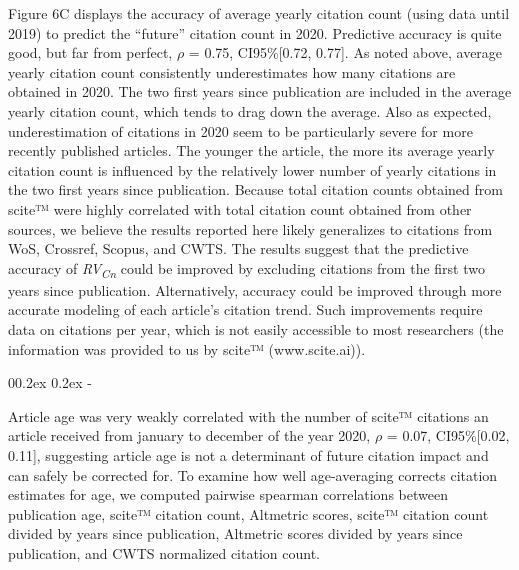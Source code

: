 \documentclass[
  man,floatsintext]{apa6}
\makeatletter
\let\oldsubparagraph\subparagraph
\renewcommand{\subparagraph}[1]{\oldsubparagraph{#1}\mbox{}}
\renewcommand{\subparagraph}[1]{\@startsection{subparagraph}{5}{1em}%
  {0\baselineskip \@plus 0.2ex \@minus 0.2ex}%
  {-\z@\relax}%
  {\normalfont\normalsize\itshape\hspace{\parindent}{#1}\textit{\addperi}}{\relax}}
\makeatother
\begin{document}
Figure 6C displays the accuracy of average yearly citation count (using data until 2019) to predict the ``future'' citation count in 2020. Predictive accuracy is quite good, but far from perfect, \(\rho\) = 0.75, CI95\%{[}0.72, 0.77{]}. As noted above, average yearly citation count consistently underestimates how many citations are obtained in 2020. The two first years since publication are included in the average yearly citation count, which tends to drag down the average. Also as expected, underestimation of citations in 2020 seem to be particularly severe for more recently published articles. The younger the article, the more its average yearly citation count is influenced by the relatively lower number of yearly citations in the two first years since publication. Because total citation counts obtained from scite™ were highly correlated with total citation count obtained from other sources, we believe the results reported here likely generalizes to citations from WoS, Crossref, Scopus, and CWTS. The results suggest that the predictive accuracy of \emph{RV\textsubscript{Cn}} could be improved by excluding citations from the first two years since publication. Alternatively, accuracy could be improved through more accurate modeling of each article's citation trend. Such improvements require data on citations per year, which is not easily accessible to most researchers (the information was provided to us by scite™ (www.scite.ai)).

\hypertarget{predictive-unbiasedness}{%
\subparagraph{Predictive unbiasedness}\label{predictive-unbiasedness}}

Article age was very weakly correlated with the number of scite™ citations an article received from january to december of the year 2020, \(\rho\) = 0.07, CI95\%{[}0.02, 0.11{]}, suggesting article age is not a determinant of future citation impact and can safely be corrected for. To examine how well age-averaging corrects citation estimates for age, we computed pairwise spearman correlations between publication age, scite™ citation count, Altmetric scores, scite™ citation count divided by years since publication, Altmetric scores divided by years since publication, and CWTS normalized citation count.
\end{document}
